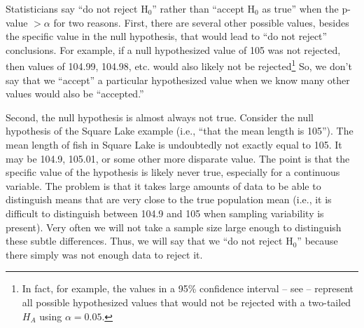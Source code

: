 \documentclass[10pt,openany]{book}\usepackage[]{graphicx}\usepackage[]{color}
\begin{document}
Statisticians say ``do not reject H$_{0}$'' rather than ``accept H$_{0}$ as true'' when the p-value $>\alpha$ for two reasons. First, there are several other possible values, besides the specific value in the null hypothesis, that would lead to ``do not reject'' conclusions.  For example, if a null hypothesized value of 105 was not rejected, then values of 104.99, 104.98, etc. would also likely not be rejected\footnote{In fact, for example, the values in a 95\% confidence interval -- see  -- represent all possible hypothesized values that would not be rejected with a two-tailed $H_{A}$ using $\alpha=0.05$.}  So, we don't say that we ``accept'' a particular hypothesized value when we know many other values would also be ``accepted.''

Second, the null hypothesis is almost always not true.  Consider the null hypothesis of the Square Lake example (i.e., ``that the mean length is 105'').  The mean length of fish in Square Lake is undoubtedly not exactly equal to 105.  It may be 104.9, 105.01, or some other more disparate value.  The point is that the specific value of the hypothesis is likely never true, especially for a continuous variable.  The problem is that it takes large amounts of data to be able to distinguish means that are very close to the true population mean (i.e., it is difficult to distinguish between 104.9 and 105 when sampling variability is present).  Very often we will not take a sample size large enough to distinguish these subtle differences.  Thus, we will say that we ``do not reject H$_{0}$'' because there simply was not enough data to reject it.
\end{document}
